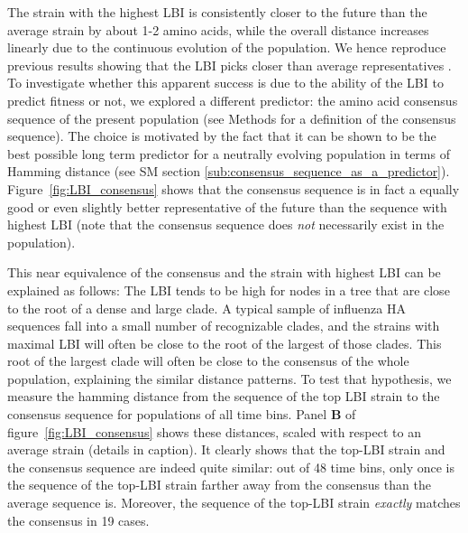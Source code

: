 \documentclass[reprint,amsmath,amssymb,superscriptaddress,showpacs,rmp]{revtex4-1}
\begin{document}
The strain with the highest LBI is consistently closer to the future than the average strain by about 1-2 amino acids, while the overall distance increases linearly due to the continuous evolution of the population.
We hence reproduce previous results showing that the LBI picks closer than average representatives \citep{neher_predicting_2014}.
To investigate whether this apparent success is due to the ability of the LBI to predict fitness or not, we explored a different predictor: the amino acid consensus sequence of the present population (see Methods for a definition of the consensus sequence).
The choice is motivated by the fact that it can be shown to be the best possible long term predictor for a neutrally evolving population in terms of Hamming distance (see SM section \ref{sub:consensus_sequence_as_a_predictor}).
Figure~\ref{fig:LBI_consensus} shows that the consensus sequence is in fact a equally good or even slightly better representative of the future than the sequence with highest LBI
(note that the consensus sequence does \emph{not} necessarily exist in the population).

This near equivalence of the consensus and the strain with highest LBI can be explained as follows:
The LBI tends to be high for nodes in a tree that are close to the root of a dense and large clade.
A typical sample of influenza HA sequences fall into a small number of recognizable clades, and the strains with maximal LBI will often be close to the root of the largest of those clades.
This root of the largest clade will often be close to the consensus of the whole population, explaining the similar distance patterns.
To test that hypothesis, we measure the hamming distance from the sequence of the top LBI strain to the consensus sequence for populations of all time bins.
Panel \textbf{B} of figure~\ref{fig:LBI_consensus} shows these distances, scaled with respect to an average strain (details in caption). It clearly shows that the top-LBI strain and the consensus sequence are indeed quite similar: out of 48 time bins, only once is the sequence of the top-LBI strain farther away from the consensus than the average sequence is. Moreover, the sequence of the top-LBI strain \emph{exactly} matches the consensus in 19 cases.
\end{document}

